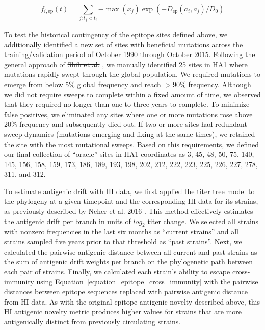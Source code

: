 \documentclass[9pt,lineno]{elife} %
\providecommand{\DIFdel}[1]{{\protect\color{red}\sout{#1}}}                      %
\providecommand{\DIFdelbegin}{} %
\providecommand{\DIFdelend}{} %
\providecommand{\DIFdeltex}[1]{{\protect\color{red}\sout{#1}}}                      %
\providecommand{\DIFdelbegin}{} %
\providecommand{\DIFdelend}{} %
\providecommand{\DIFdel}[1]{\texorpdfstring{\DIFdeltex{#1}}{}} %
\newcommand{\DIFscaledelfig}{0.5}
\newlength{\DIFdelgraphicswidth} %
\newlength{\DIFdelgraphicsheight} %
\newcommand{\DIFdelincludegraphics}[2][]{%
\sbox{\DIFdelgraphicsbox}{\DIFOincludegraphics[#1]{#2}}%
\settoboxwidth{\DIFdelgraphicswidth}{\DIFdelgraphicsbox} %
\settoboxtotalheight{\DIFdelgraphicsheight}{\DIFdelgraphicsbox} %
\scalebox{\DIFscaledelfig}{%
\parbox[b]{\DIFdelgraphicswidth}{\usebox{\DIFdelgraphicsbox}\\[-\baselineskip] \rule{\DIFdelgraphicswidth}{0em}}\llap{\resizebox{\DIFdelgraphicswidth}{\DIFdelgraphicsheight}{%
\setlength{\unitlength}{\DIFdelgraphicswidth}%
\begin{picture}(1,1)%
\thicklines\linethickness{2pt} %
{\color[rgb]{1,0,0}\put(0,0){\framebox(1,1){}}}%
{\color[rgb]{1,0,0}\put(0,0){\line( 1,1){1}}}%
{\color[rgb]{1,0,0}\put(0,1){\line(1,-1){1}}}%
\end{picture}%
}\hspace*{3pt}}} %
} %
\DeclareRobustCommand{\DIFdelbegin}{\DIFOdelbegin \let\includegraphics\DIFdelincludegraphics} %
\DeclareRobustCommand{\DIFdelend}{\DIFOaddend \let\includegraphics\DIFOincludegraphics} %
\begin{document}
\begin{equation}
    f_{i,\mathrm{ep}}(t) = \sum_{j: t_{j} < t_{i}}{-\max(x_{j})\exp{(-D_{\mathrm{ep}}(a_{i}, a_{j}) / D_{0})}}
    \label{equation_epitope_cross_immunity}
\end{equation}

To test the historical contingency of the epitope sites defined above, we additionally identified a new set of sites with beneficial mutations across the training/validation period of October 1990 through October 2015.
Following the general approach of \DIFdelbegin \DIFdel{Shih et al. }\DIFdelend \cite{Shih:2007bd}, we manually identified 25 sites in HA1 where mutations rapidly swept through the global population.
We required mutations to emerge from below 5\% global frequency and reach $>$90\% frequency.
Although we did not require sweeps to complete within a fixed amount of time, we observed that they required no longer than one to three years to complete.
To minimize false positives, we eliminated any sites where one or more mutations rose above 20\% frequency and subsequently died out.
If two or more sites had redundant sweep dynamics (mutations emerging and fixing at the same times), we retained the site with the most mutational sweeps.
Based on this requirements, we defined our final collection of ``oracle'' sites in HA1 coordinates as 3, 45, 48, 50, 75, 140, 145, 156, 158, 159, 173, 186, 189, 193, 198, 202, 212, 222, 223, 225, 226, 227, 278, 311, and 312.

To estimate antigenic drift with HI data, we first applied the titer tree model to the phylogeny at a given timepoint and the corresponding HI data for its strains, as previously described by \DIFdelbegin \DIFdel{Neher et al. 2016 }\DIFdelend \cite{Neher:2016hy}.
This method effectively estimates the antigenic drift per branch in units of $log_{2}$ titer change.
We selected all strains with nonzero frequencies in the last six months as ``current strains'' and all strains sampled five years prior to that threshold as ``past strains''.
Next, we calculated the pairwise antigenic distance between all current and past strains as the sum of antigenic drift weights per branch on the phylogenetic path between each pair of strains.
Finally, we calculated each strain's ability to escape cross-immunity using Equation~\ref{equation_epitope_cross_immunity} with the pairwise distances between epitope sequences replaced with pairwise antigenic distance from HI data.
As with the original epitope antigenic novelty described above, this HI antigenic novelty metric produces higher values for strains that are more antigenically distinct from previously circulating strains.
\end{document}
